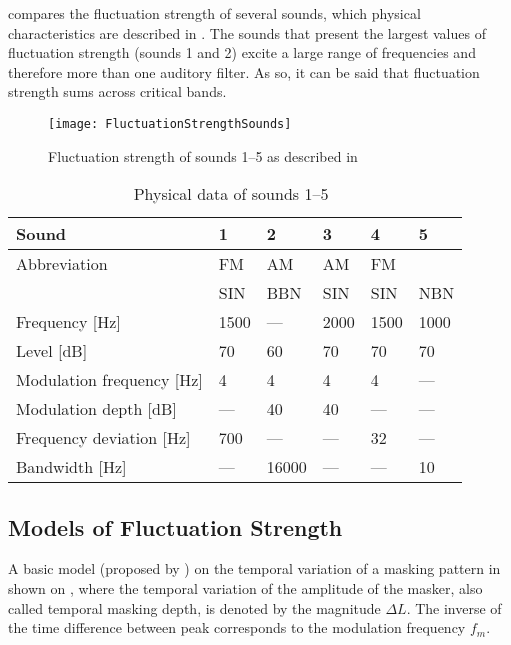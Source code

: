 \documentclass[../main.tex]{subfiles}
\begin{document}
\begin{theoreticalbackground}
 compares the fluctuation strength of several sounds,
which physical characteristics are described in . The
sounds that present the largest values of fluctuation strength (sounds 1 and 2)
excite a large range of frequencies and therefore more than one auditory filter.
As so, it can be said that fluctuation strength sums across critical bands.

\begin{figure}[!ht]
  \centering
  \texttt{[image: FluctuationStrengthSounds]}
  \caption{Fluctuation strength of sounds 1--5 as described in
    ~\cite[pp. 252]{Fastl2007Psychoacoustics}}
\label{fig:flucstrensnds}
\end{figure}

\begin{table}[!ht]
  \centering
  \begin{tabu} to \linewidth{ lXXXXX }
    \toprule
    Sound & 1 & 2 & 3 & 4 & 5 \\
    \midrule
    Abbreviation & FM & AM & AM & FM & \\
    & SIN & BBN & SIN & SIN & NBN \\
    Frequency [Hz] & 1500 & --- & 2000 & 1500 & 1000 \\
    Level [dB] & 70 & 60 & 70 & 70 & 70 \\
    Modulation frequency [Hz] & 4 & 4 & 4 & 4 & --- \\
    Modulation depth [dB] & --- & 40 & 40 & --- & --- \\
    Frequency deviation [Hz] & 700 & --- & --- & 32 & --- \\
    Bandwidth [Hz] & --- & 16000 & --- & --- & 10 \\
    \bottomrule
  \end{tabu}
  \caption{Physical data of sounds
    1--5~\cite[pp. 253]{Fastl2007Psychoacoustics}}
\label{tab:flucstrensnds}
\end{table}

\subsection{Models of Fluctuation Strength}

A basic model (proposed by \citeauthor{Fastl2007Psychoacoustics}
\cite[pp.~254]{Fastl2007Psychoacoustics}) on the temporal variation of a masking
pattern in shown on , where the temporal variation of
the amplitude of the masker, also called temporal masking depth, is denoted by
the magnitude $\Delta L$. The inverse of the time difference between peak
corresponds to the modulation frequency $f_{m}$.


\end{theoreticalbackground}
\end{document}
